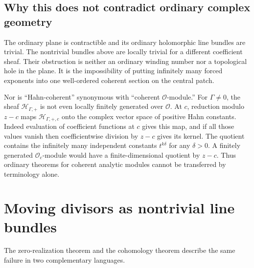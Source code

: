 \documentclass[11pt,letterpaper]{article}
\theoremstyle{definition}
\theoremstyle{remark}
\newcommand{\OO}{\mathcal O}
\newcommand{\HP}{\mathscr H_{\Gamma,+}}
\numberwithin{equation}{section}
\begin{document}
\subsection{Why this does not contradict ordinary complex geometry}
The ordinary plane is contractible and its ordinary holomorphic line bundles are trivial. The nontrivial bundles above are locally trivial for a different coefficient sheaf. Their obstruction is neither an ordinary winding number nor a topological hole in the plane. It is the impossibility of putting infinitely many forced exponents into one well-ordered coherent section on the central patch.

Nor is ``Hahn-coherent'' synonymous with ``coherent $\OO$-module.'' For $\Gamma\ne0$, the sheaf $\HP$ is not even locally finitely generated over $\OO$. At $c$, reduction modulo $z-c$ maps $\mathscr H_{\Gamma,+,c}$ onto the complex vector space of positive Hahn constants. Indeed evaluation of coefficient functions at $c$ gives this map, and if all those values vanish then coefficientwise division by $z-c$ gives its kernel. The quotient contains the infinitely many independent constants $t^{k\delta}$ for any $\delta>0$. A finitely generated $\OO_c$-module would have a finite-dimensional quotient by $z-c$. Thus ordinary theorems for coherent analytic modules cannot be transferred by terminology alone.

\section{Moving divisors as nontrivial line bundles}\label{sec:geometric}
The zero-realization theorem and the cohomology theorem describe the same failure in two complementary languages.
\end{document}
